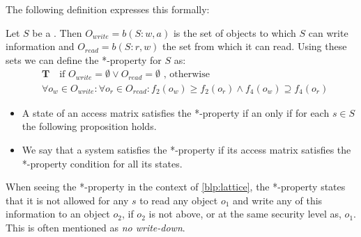 The following definition expresses this formally:
\begin{definition}
Let $S$ be a \principal{}.
Then $O_{write} = b(S: w, a)$ is the set of objects to which $S$ can write information and $O_{read} = b(S: r,w)$ the set from which it can read.
Using these sets we can define the *-property for $S$ as:
\begin{align*}
  &\textbf{T} \quad \text{if }O_{write} = \emptyset \vee O_{read} = \emptyset \text{ , otherwise }\\
  &\forall o_w \in O_{write}: \forall o_r \in O_{read}: f_2(o_w) \geq f_2(o_r) \wedge f_4(o_w) \supseteq f_4(o_r)
\end{align*}

\begin{itemize}
  \item A state of an access matrix satisfies the *-property if an only if for each $s \in S$ the following proposition holds.
  \item We say that a system satisfies the *-property if its access matrix satisfies the *-property condition for all its states.
\end{itemize}
\end{definition}

When seeing the *-property in the context of \cref{blp:lattice}, the *-property states that it is not allowed for any \ssubject{} $s$ to read any object $o_1$ and write any of this information to an object $o_2$, if $o_2$ is not above, or at the same security level as, $o_1$.
This is often mentioned as \emph{no write-down}.
